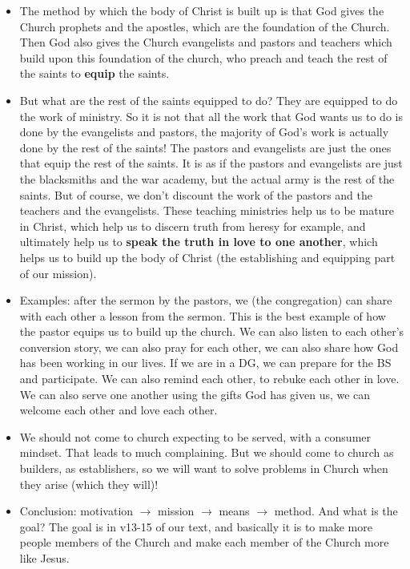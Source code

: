 \begin{itemize}
{  through the Son to us (in the economy of salvation), the Spirit gives us
  all individual gifts that we use to build up the body of Christ, to build
  each other up in love.  }
  \item{The method by which the body of Christ is built up is that God gives the Church prophets and the apostles, which are the foundation of the Church. Then God also gives the Church evangelists and pastors and teachers which build upon this foundation of the church, who preach and teach the rest of the saints to \textbf{equip} the saints. }
  \item{But what are the rest of the saints equipped to do? They are equipped to do the work of ministry. So it is not that all the work that God wants us to do is done by the evangelists and pastors, the majority of God’s work is actually done by the rest of the saints! The pastors and evangelists are just the ones that equip the rest of the saints. It is as if the pastors and evangelists are just the blacksmiths and the war academy, but the actual army is the rest of the saints. But of course, we don’t discount the work of the pastors and the teachers and the evangelists. These teaching ministries help us to be mature in Christ, which help us to discern truth from heresy for example, and ultimately help us to \textbf{speak the truth in love to one another}, which helps us to build up the body of Christ (the establishing and equipping part of our mission). } 
  \item{Examples: after the sermon by the pastors, we (the congregation) can share with each other a lesson from the sermon. This is the best example of how the pastor equips us to build up the church. We can also listen to each other’s conversion story, we can also pray for each other, we can also share how God has been working in our lives. If we are in a DG, we can prepare for the BS and participate. We can also remind each other, to rebuke each other in love. We can also serve one another using the gifts God has given us, we can welcome each other and love each other. }
  \item{We should not come to church expecting to be served, with a consumer mindset. That leads to much complaining. But we should come to church as builders, as establishers, so we will want to solve problems in Church when they arise (which they will)!}
  \item{Conclusion: motivation $\rightarrow$ mission $\rightarrow$ means $\rightarrow$ method. And what is the goal? The goal is in v13-15 of our text, and basically it is to make more people members of the Church and make each member of the Church more like Jesus. }
\end{itemize}